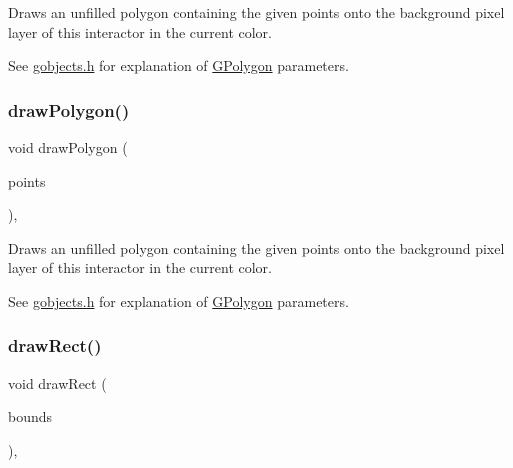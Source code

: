 Draws an unfilled polygon containing the given points onto the background pixel layer of this interactor in the current color. 

See \mbox{\hyperlink{gobjects_8h_source}{gobjects.\+h}} for explanation of \mbox{\hyperlink{classGPolygon}{G\+Polygon}} parameters. \mbox{\label{classGDrawingSurface_a021ee881e0d154dc4dd059698742889c}} 
\subsubsection{\texorpdfstring{draw\+Polygon()}{drawPolygon()}\hspace{0.1cm}{\footnotesize\ttfamily [2/2]}}
{\footnotesize\ttfamily void draw\+Polygon (\begin{DoxyParamCaption}\item[{std\+::initializer\+\_\+list$<$ \mbox{\hyperlink{classGPoint}{G\+Point}} $>$}]{points }\end{DoxyParamCaption})\hspace{0.3cm}{\ttfamily [virtual]}, {\ttfamily [inherited]}}



Draws an unfilled polygon containing the given points onto the background pixel layer of this interactor in the current color. 

See \mbox{\hyperlink{gobjects_8h_source}{gobjects.\+h}} for explanation of \mbox{\hyperlink{classGPolygon}{G\+Polygon}} parameters. \mbox{\label{classGDrawingSurface_a3dd4cc5891149dfc36746264f7289877}} 
\subsubsection{\texorpdfstring{draw\+Rect()}{drawRect()}\hspace{0.1cm}{\footnotesize\ttfamily [1/2]}}
{\footnotesize\ttfamily void draw\+Rect (\begin{DoxyParamCaption}\item[{const \mbox{\hyperlink{classGRectangle}{G\+Rectangle}} \&}]{bounds }\end{DoxyParamCaption})\hspace{0.3cm}{\ttfamily [virtual]}, {\ttfamily [inherited]}}



